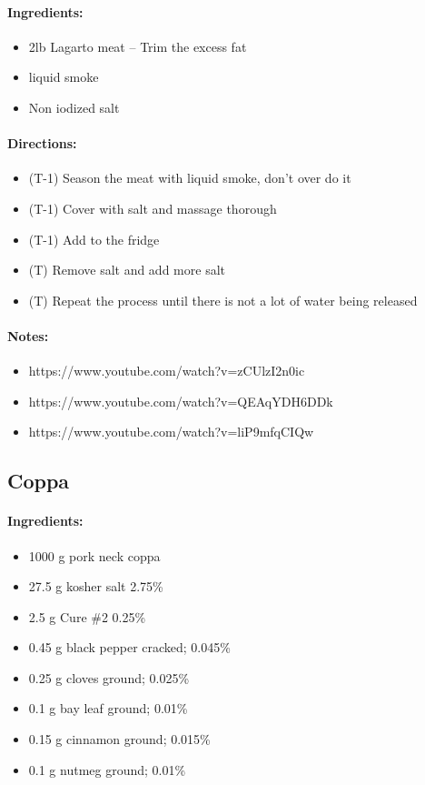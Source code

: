 \documentclass{article}
\begin{document}
\paragraph{Ingredients:}

\begin{itemize}
	\item 2lb Lagarto meat -- Trim the excess fat
	\item liquid smoke
	\item Non iodized salt
\end{itemize}

\paragraph{Directions:}
\begin{itemize}
	\item (T-1) Season the meat with liquid smoke, don't over do it
	\item (T-1) Cover with salt and massage thorough
	\item (T-1) Add to the fridge
	\item (T) Remove salt and add more salt
	\item (T) Repeat the process until there is not a lot of water being released
\end{itemize}

\paragraph{Notes:}
\begin{itemize}
	\item https://www.youtube.com/watch?v=zCUlzI2n0ic
	\item https://www.youtube.com/watch?v=QEAqYDH6DDk
	\item https://www.youtube.com/watch?v=liP9mfqCIQw
\end{itemize}

\subsection{Coppa}

\paragraph{Ingredients:}

\begin{itemize}
	\item 1000 g pork neck coppa	
	\item 27.5 g kosher salt 2.75\%
	\item 2.5 g Cure \#2 0.25\%
	\item 0.45 g black pepper cracked; 0.045\%
	\item 0.25 g cloves ground; 0.025\%
	\item 0.1 g bay leaf ground; 0.01\%
	\item 0.15 g cinnamon ground; 0.015\%
	\item 0.1 g nutmeg ground; 0.01\%
\end{itemize}
\end{document}
